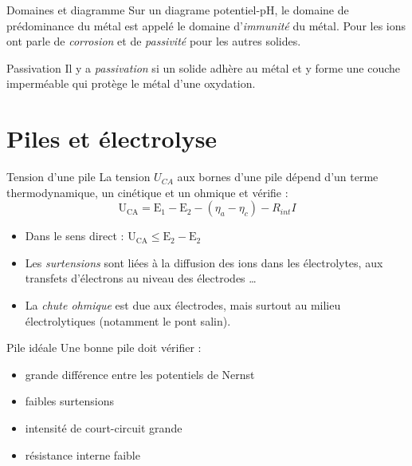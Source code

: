 \documentclass[french, a4paper, 11pt, twocolumn]{article}
\begin{document}
    \begin{cadre}{Domaines et diagramme}
        Sur un diagrame potentiel-pH, le domaine de prédominance du métal est appelé le domaine d'\emph{immunité} du métal.
        Pour les ions ont parle de \emph{corrosion} et de \emph{passivité} pour les autres solides.
    \end{cadre}

    \begin{cadre}{Passivation}
        Il y a \emph{passivation} si un solide adhère au métal et y forme une couche imperméable qui protège le métal d'une oxydation. 
    \end{cadre}

    \section{Piles et électrolyse}

    \begin{cadre}{Tension d'une pile}
        La tension \(U_{CA}\) aux bornes d'une pile dépend d'un terme
        thermodynamique, un cinétique et un ohmique et vérifie : 
            \[\mathrm{U_{CA}=E_1-E_2}-(\eta_a-\eta_c)-R_{int}I\]
        
        \tcblower
        \begin{itemize}
            \item Dans le sens direct : \(\mathrm{U_{CA}\leq E_2-E_2}\)
            \item Les \emph{surtensions} sont liées à la diffusion des ions dans les électrolytes,
                aux transfets d'électrons au niveau des électrodes \dots
            \item La \emph{chute ohmique} est due aux électrodes, mais surtout au milieu électrolytiques (notamment le pont salin).
        \end{itemize}
    \end{cadre}

    \begin{cadre}{Pile idéale}
        Une bonne pile doit vérifier :
        \begin{itemize}
            \item grande différence entre les potentiels de Nernst
            \item faibles surtensions
            \item intensité de court-circuit grande
            \item résistance interne faible
        \end{itemize}
    \end{cadre}
\end{document}
